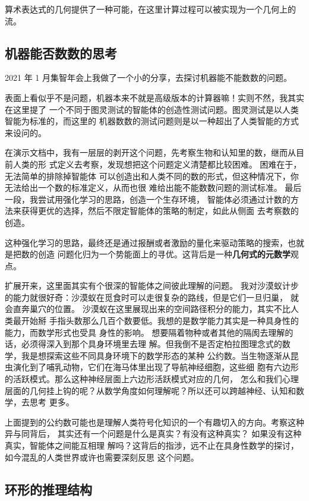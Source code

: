 \documentclass[a4paper,12pt]{article}
\numberwithin{problem}{section}
\numberwithin{definition}{section}
\numberwithin{lemma}{section}
\numberwithin{proposition}{section}
\numberwithin{theorem}{section}
\numberwithin{grammar}{section}
\numberwithin{program}{section}
\numberwithin{convention}{section}
\numberwithin{corollary}{section}
\begin{document}
算术表达式的几何提供了一种可能，在这里计算过程可以被实现为一个几何上的流。

\subsection{机器能否数数的思考}

2021 年 1 月集智年会上我做了一个小的分享，去探讨机器能不能数数的问题。

表面上看似乎不是问题，机器本来不就是高级版本的计算器嘛！实则不然，我其实在这里提了
一个不同于图灵测试的智能体的创造性测试问题。图灵测试是以人类智能为标准的，而这里的
机器数数的测试问题则是以一种超出了人类智能的方式来设问的。

在演示文档中，我有一层层的剥开这个问题，先考察生物和认知里的数，继而从目前人类的形
式定义去考察，发现想把这个问题定义清楚都比较困难。 困难在于，无法简单的排除掉智能体
可以创造出和人类不同的数的形式，但这种情况下，你无法给出一个数的标准定义，从而也很
难给出能不能数数问题的测试标准。 最后一段，我尝试用强化学习的思路，创造一个生存环境，
智能体必须通过计数的方法来获得更优的选择，然后不限定智能体的策略的制定，如此从侧面
去考察数的创造。

这种强化学习的思路，最终还是通过报酬或者激励的量化来驱动策略的搜索，也就是把数的创造
问题化归为一个势能面上的寻优。这背后是一种\textbf{几何式的元数学}观点。

扩展开来，这里面其实有个很深的智能体之间彼此理解的问题。
我对沙漠蚁计步的能力就很好奇：沙漠蚁在觅食时可以走很复杂的路线，但是它们一旦归巢，
就会直奔巢穴的位置。 沙漠蚁在这里展现出来的空间路径积分的能力，其实不比人类最开始掰
手指头数那么几百个数要低。我想的是数学能力其实是一种具身性的能力，而数学形式也受具
身性的影响。 想要隔着物种或者其他的隔阂去理解的话，必须得深入到那个具身环境里去理
解。但我倒不是否定柏拉图理念式的数学，我是想探索这些不同具身环境下的数学形态的某种
公约数。当生物逐渐从昆虫演化到了哺乳动物，它们在海马体里出现了导航神经细胞，这些细
胞有六边形的活跃模式。那么这种神经层面上六边形活跃模式对应的几何， 怎么和我们心理
层面的几何挂上钩的呢？从数学角度如何理解呢？所以还可以跨越神经、认知和数学，去思考
更多。

上面提到的公约数可能也是理解人类符号化知识的一个有趣切入的方向。考察这种异与同背后，
其实还有一个问题是什么是真实？有没有这种真实？ 如果没有这种真实，智能体之间能互相理
解吗？这背后的指涉，远不止在具身性数学的探讨，如今混乱的人类世界或许也需要深刻反思
这个问题。

\subsection{环形的推理结构}
\end{document}
